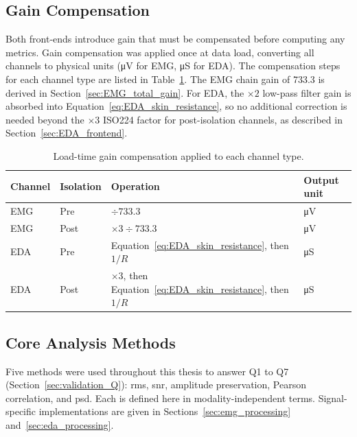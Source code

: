 \subsection{Gain Compensation}\label{sec:gain_compensation}
Both front-ends introduce gain that must be compensated before computing any metrics. Gain compensation was applied once at data load, converting all channels to physical units (\si{\micro\volt} for EMG, \si{\micro\siemens} for EDA). The compensation steps for each channel type are listed in Table~\ref{tab:gain_compensation}. The EMG chain gain of \num{733.3} is derived in Section~\ref{sec:EMG_total_gain}. For EDA, the $\times 2$ low-pass filter gain is absorbed into Equation~\ref{eq:EDA_skin_resistance}, so no additional correction is needed beyond the $\times 3$ ISO224 factor for post-isolation channels, as described in Section~\ref{sec:EDA_frontend}. 

\begin{table}[!htbp]
\centering
\caption{Load-time gain compensation applied to each channel type.}
\label{tab:gain_compensation}
\begin{tabularx}{\textwidth}{l l l X}
\toprule
\textbf{Channel} & \textbf{Isolation} & \textbf{Operation} & \textbf{Output unit} \\
\midrule
EMG & Pre  & $\div 733.3$                                                & \si{\micro\volt} \\
\addlinespace
EMG & Post & $\times 3 \div 733.3$                                       & \si{\micro\volt} \\
\addlinespace
EDA & Pre  & Equation~\ref{eq:EDA_skin_resistance}, then $1/R$            & \si{\micro\siemens} \\
\addlinespace
EDA & Post & $\times 3$, then Equation~\ref{eq:EDA_skin_resistance}, then $1/R$ & \si{\micro\siemens} \\
\bottomrule
\end{tabularx}
\end{table}

\FloatBarrier

\subsection{Core Analysis Methods}
\label{sec:core_analysis}

Five methods were used throughout this thesis to answer Q1 to Q7 (Section~\ref{sec:validation_Q}): \gls{rms}, \gls{snr}, amplitude preservation, Pearson correlation, and \gls{psd}. Each is defined here in modality-independent terms. Signal-specific implementations are given in Sections~\ref{sec:emg_processing} and~\ref{sec:eda_processing}.

